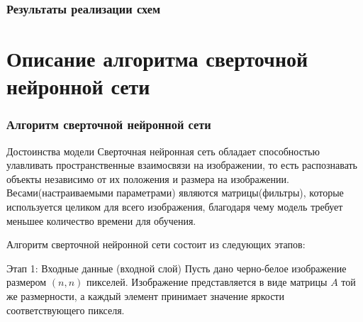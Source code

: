 \documentclass{beamer}
\begin{document}
\begin{frame}
	\frametitle{Результаты реализации схем}
	\begin{table}[ht!]
		\caption{Нормы ошибки разностных схем}
		\centering
		\label{tab1}
	\end{table}
\end{frame}

\section{Описание алгоритма сверточной нейронной сети}
\begin{frame}
	\frametitle{Алгоритм сверточной нейронной сети}	
	\begin{block}{Достоинства модели}
		Сверточная нейронная сеть обладает способностью улавливать пространственные взаимосвязи на изображении, то есть распознавать объекты независимо от их положения и размера на изображении. Весами(настраиваемыми параметрами) являются матрицы(фильтры), которые используется целиком для всего изображения, благодаря чему модель требует меньшее количество времени для обучения.
	\end{block}
	Алгоритм сверточной нейронной сети состоит из следующих этапов:
	\begin{block}{Этап 1: Входные данные (входной слой)}
		Пусть дано черно-белое изображение размером $(n, n)$ пикселей. Изображение представляется в виде матрицы $A$ той же размерности, а каждый элемент принимает значение яркости соответствующего пикселя.
	\end{block}
\end{frame}
\end{document}
